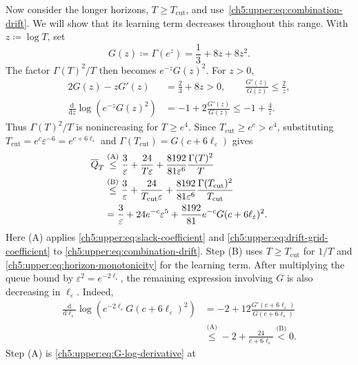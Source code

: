 Now consider the longer horizons, $T\ge T_{\mathrm{cut}}$, and
use~\eqref{ch5:upper:eq:combination-drift}. We will show that
its learning term decreases throughout this range. With $z\coloneqq\log T$, set
\[
 G(z)\coloneqq\Gamma(e^z)=\frac13+8z+8z^2.
\]
The factor $\Gamma(T)^2/T$ then becomes $e^{-z}G(z)^2$.
For $z>0$,
\begin{align}
 2G(z)-zG'(z)&=\frac23+8z>0,
 \qquad \frac{G'(z)}{G(z)}\le\frac2z,
 \label{ch5:upper:eq:G-log-derivative}\\
 \frac{\mathrm d}{\mathrm dz}\log\!\left(e^{-z}G(z)^2\right)
 &=-1+2\frac{G'(z)}{G(z)}\le-1+\frac4z.
 \label{ch5:upper:eq:horizon-monotonicity}
\end{align}
Thus $\Gamma(T)^2/T$ is nonincreasing for $T\ge e^4$.
Since $T_{\mathrm{cut}}\ge e^c>e^4$, substituting
$T_{\mathrm{cut}}=e^c\varepsilon^{-6}=e^{c+6\ell_\varepsilon}$ and
$\Gamma(T_{\mathrm{cut}})=G(c+6\ell_\varepsilon)$ gives
\begin{align}
 \overline Q_T
 &\overset{\text{(A)}}{\le}\frac3\varepsilon+\frac{24}{T\varepsilon}
 +\frac{8192}{81\varepsilon^6}\frac{\Gamma(T)^2}{T}\notag\\
 &\overset{\text{(B)}}{\le}\frac3\varepsilon+\frac{24}{T_{\mathrm{cut}}\varepsilon}
 +\frac{8192}{81\varepsilon^6}\frac{\Gamma(T_{\mathrm{cut}})^2}{T_{\mathrm{cut}}}\notag\\
 &=\frac3\varepsilon+24e^{-c}\varepsilon^5
 +\frac{8192}{81}e^{-c}G(c+6\ell_\varepsilon)^2.
 \label{ch5:upper:eq:long-cutoff-bound}
\end{align}
Here (A) applies \eqref{ch5:upper:eq:slack-coefficient} and
\eqref{ch5:upper:eq:drift-grid-coefficient} to
\eqref{ch5:upper:eq:combination-drift}. Step (B) uses $T\ge T_{\mathrm{cut}}$ for
$1/T$ and \eqref{ch5:upper:eq:horizon-monotonicity} for the learning term.
After multiplying the queue bound by $\varepsilon^2=e^{-2\ell_\varepsilon}$,
the remaining expression involving $G$ is also decreasing in
$\ell_\varepsilon$. Indeed,
\begin{equation}
\begin{aligned}
 \frac{\mathrm d}{\mathrm d\ell_\varepsilon}
 \log\!\left(e^{-2\ell_\varepsilon}
            G(c+6\ell_\varepsilon)^2\right)
 &=-2+12\frac{G'(c+6\ell_\varepsilon)}{G(c+6\ell_\varepsilon)}\\
 &\overset{\text{(A)}}{\le}-2+\frac{24}{c+6\ell_\varepsilon}
 \overset{\text{(B)}}{<}0.
\end{aligned}
 \label{ch5:upper:eq:slack-monotonicity}
\end{equation}
Step (A) is \eqref{ch5:upper:eq:G-log-derivative} at
